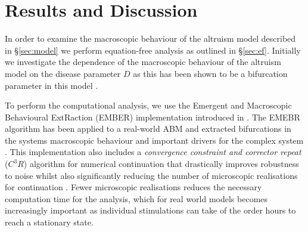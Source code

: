 \documentclass[11pt]{article}
\begin{document}
\section{Results and Discussion}

In order to examine the macroscopic behaviour of the altruism model described in \S\ref{sec:model} we perform equation-free analysis as outlined in \S\ref{sec:ef}. Initially we investigate the dependence of the macroscopic behaviour of the altruism model on the disease parameter $D$ as this has been shown to be a bifurcation parameter in this model \cite{Thomas2016ember}.

To perform the computational analysis, we use the Emergent and Macroscopic Behavioural ExtRaction (EMBER) implementation introduced in \cite{Thomas2016ember}. The EMEBR algorithm has been applied to a real-world ABM and extracted bifurcations in the systems macroscopic behaviour and important drivers for the complex system \cite{Thomas2016limno}. This implementation also includes a {\em convergence constraint and corrector repeat} ($C^3R$) algorithm for numerical continuation that drastically improves robustness to noise whilst also significantly reducing the number of microscopic realisations for continuation \cite{Thomas2016ember}. Fewer microscopic realisations reduces the necessary computation time for the analysis, which for real world models becomes increasingly important as individual stimulations can take of the order hours to reach a stationary state.   
\end{document}
